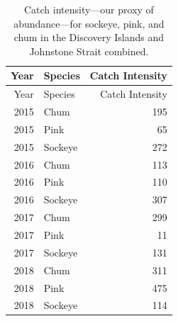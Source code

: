 \documentclass[fleqn,10pt]{wlpeerj} %
\begin{document}
\begin{longtable}[]{@{}rlr@{}}
\caption{\label{tab:catch-intensity-table} Catch intensity---our proxy of
abundance---for sockeye, pink, and chum in the Discovery Islands and
Johnstone Strait combined.}\tabularnewline
\toprule
Year & Species & Catch Intensity\tabularnewline
\midrule
\endfirsthead
\toprule
Year & Species & Catch Intensity\tabularnewline
\midrule
\endhead
2015 & Chum & 195\tabularnewline
2015 & Pink & 65\tabularnewline
2015 & Sockeye & 272\tabularnewline
2016 & Chum & 113\tabularnewline
2016 & Pink & 110\tabularnewline
2016 & Sockeye & 307\tabularnewline
2017 & Chum & 299\tabularnewline
2017 & Pink & 11\tabularnewline
2017 & Sockeye & 131\tabularnewline
2018 & Chum & 311\tabularnewline
2018 & Pink & 475\tabularnewline
2018 & Sockeye & 114\tabularnewline
\bottomrule
\end{longtable}
\end{document}
